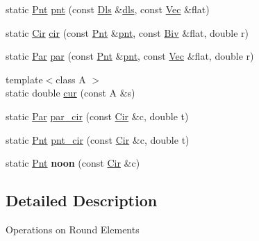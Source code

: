 \begin{DoxyCompactItemize}
\item 
static \hyperlink{namespacevsr_a2d05beb9721c5d9211b479af6d47222d}{Pnt} \hyperlink{structvsr_1_1_ro_a895177c1a8f192a5c02341e9476858b2}{pnt} (const \hyperlink{classvsr_1_1_m_v}{Dls} \&\hyperlink{structvsr_1_1_ro_a38ad7d450cb8387524c17fda3a3064f2}{dls}, const \hyperlink{namespacevsr_a0d061c30ac198a710a1b92dd8b343273}{Vec} \&flat)
\item 
static \hyperlink{namespacevsr_a2744605aa828e495fc85463b7ae0d045}{Cir} \hyperlink{structvsr_1_1_ro_a3cf5524e054f0153abe43a76a822e5d8}{cir} (const \hyperlink{namespacevsr_a2d05beb9721c5d9211b479af6d47222d}{Pnt} \&\hyperlink{structvsr_1_1_ro_a895177c1a8f192a5c02341e9476858b2}{pnt}, const \hyperlink{namespacevsr_ab2f5aee828c6c805b8a86a5b077d192c}{Biv} \&flat, double r)
\item 
static \hyperlink{namespacevsr_ae046793ece205351429a6346a66fd6eb}{Par} \hyperlink{structvsr_1_1_ro_a709594e9a490d1ee49ac498d6f47cf11}{par} (const \hyperlink{namespacevsr_a2d05beb9721c5d9211b479af6d47222d}{Pnt} \&\hyperlink{structvsr_1_1_ro_a895177c1a8f192a5c02341e9476858b2}{pnt}, const \hyperlink{namespacevsr_a0d061c30ac198a710a1b92dd8b343273}{Vec} \&flat, double r)
\item 
{\footnotesize template$<$class A $>$ }\\static double \hyperlink{structvsr_1_1_ro_a4c60d4d532e13ef6171a288c16c19b89}{cur} (const A \&s)
\item 
static \hyperlink{namespacevsr_ae046793ece205351429a6346a66fd6eb}{Par} \hyperlink{structvsr_1_1_ro_abcde99312538d4b10f8a59b729940cea}{par\-\_\-cir} (const \hyperlink{namespacevsr_a2744605aa828e495fc85463b7ae0d045}{Cir} \&c, double t)
\item 
static \hyperlink{namespacevsr_a2d05beb9721c5d9211b479af6d47222d}{Pnt} \hyperlink{structvsr_1_1_ro_a4ae3c4b3d3a4f65f12094d7cb71e4a53}{pnt\-\_\-cir} (const \hyperlink{namespacevsr_a2744605aa828e495fc85463b7ae0d045}{Cir} \&c, double t)
\item 
\hypertarget{structvsr_1_1_ro_a07af7a52c0f1da9297bd0b57821b16b2}{static \hyperlink{namespacevsr_a2d05beb9721c5d9211b479af6d47222d}{Pnt} {\bfseries noon} (const \hyperlink{namespacevsr_a2744605aa828e495fc85463b7ae0d045}{Cir} \&c)}\label{structvsr_1_1_ro_a07af7a52c0f1da9297bd0b57821b16b2}

\end{DoxyCompactItemize}


\subsection{Detailed Description}
Operations on Round Elements 

